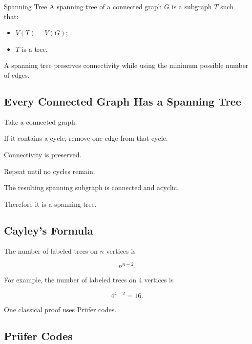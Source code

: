 \begin{definitionbox}{Spanning Tree}
A spanning tree of a connected graph \(G\) is a subgraph \(T\) such that:
\begin{itemize}
    \item \(V(T)=V(G)\);
    \item \(T\) is a tree.
\end{itemize}
\end{definitionbox}

A spanning tree preserves connectivity while using the minimum possible
number of edges.

\subsection{Every Connected Graph Has a Spanning Tree}
\label{subsec:connected-spanning-tree}

Take a connected graph.

If it contains a cycle, remove one edge from that cycle.

Connectivity is preserved.

Repeat until no cycles remain.

The resulting spanning subgraph is connected and acyclic.

Therefore it is a spanning tree.

\subsection{Cayley's Formula}
\label{subsec:cayleys-formula}

\begin{theorem}
The number of labeled trees on \(n\) vertices is

\[
\boxed{
n^{n-2}.
}
\]
\end{theorem}

For example, the number of labeled trees on \(4\) vertices is

\[
4^{4-2}=16.
\]

One classical proof uses Prüfer codes.

\subsection{Prüfer Codes}
\label{subsec:prufer-codes}

